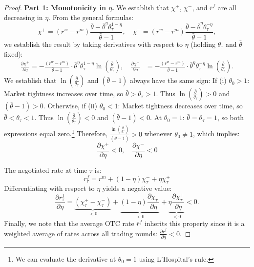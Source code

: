 \begin{proof}
\textbf{Part 1: Monotonicity in $\eta$.}  
We establish that $\chi^+$, $\chi^-$, and $\overline{r}^f$ are all decreasing in $\eta$. From the general formulas:
\begin{equation*}
\chi^+ = (r^w - r^m) \frac{\bar{\theta} - \bar{\theta}^{\eta}\theta_\tau^{1-\eta}}{\bar{\theta} - 1}, \quad \chi^- = (r^w - r^m) \frac{\bar{\theta} - \bar{\theta}^{\eta}\theta_\tau^{-\eta}}{\bar{\theta} - 1},
\end{equation*}
we establish the result by taking derivatives with respect to $\eta$ (holding $\theta_\tau$ and $\bar{\theta}$ fixed):
\begin{align*}
\frac{\partial \chi^+}{\partial \eta} = -\frac{(r^w - r^m)}{\bar{\theta} - 1} \cdot \bar{\theta}^{\eta}\theta_\tau^{1-\eta}\ln\left(\frac{\bar{\theta}}{\theta_\tau}\right),
\quad 
\frac{\partial \chi^-}{\partial \eta} &= -\frac{(r^w - r^m)}{\bar{\theta} - 1} \cdot \bar{\theta}^{\eta}\theta_\tau^{-\eta}\ln\left(\frac{\bar{\theta}}{\theta_\tau}\right).
\end{align*}
We establish that $\ln\left(\frac{\bar{\theta}}{\theta_\tau}\right)$ and $(\bar{\theta}-1)$ always have the same sign: If (i) $\theta_0 > 1$: Market tightness increases over time, so $\bar{\theta} > \theta_\tau > 1$. Thus $\ln\left(\frac{\bar{\theta}}{\theta_\tau}\right) > 0$ and $(\bar{\theta}-1) > 0$. Otherwise, if  (ii) $\theta_0 < 1$: Market tightness decreases over time, so $\bar{\theta} < \theta_\tau < 1$. Thus $\ln\left(\frac{\bar{\theta}}{\theta_\tau}\right) < 0$ and $(\bar{\theta}-1) < 0$. At $\theta_0 = 1$: $\bar{\theta} = \theta_\tau = 1$, so both expressions equal zero.\footnote{We can evaluate the derivative at $\theta_0 = 1$ using L'Hospital's rule.} Therefore, $\frac{\ln\left(\frac{\bar{\theta}}{\theta_\tau}\right)}{(\bar{\theta}-1)} > 0$ whenever $\theta_0 \neq 1$, which implies:
\begin{equation*}
\frac{\partial \chi^+}{\partial \eta} < 0, \quad \frac{\partial \chi^-}{\partial \eta} < 0
\end{equation*}

The negotiated rate at time $\tau$ is:
\begin{equation*}
r^f_\tau = r^m + (1-\eta)\chi^-_\tau + \eta\chi^+_\tau
\end{equation*}
Differentiating with respect to $\eta$ yields a negative value:
\begin{equation*}
\frac{\partial r^f_\tau}{\partial \eta} = \underbrace{(\chi^+_\tau - \chi^-_\tau)}_{<0} + \underbrace{(1-\eta)\frac{\partial \chi^-_\tau}{\partial \eta}}_{<0} + \underbrace{\eta\frac{\partial \chi^+_\tau}{\partial \eta}}_{<0} < 0.
\end{equation*}
Finally, we note that the average OTC rate $\overline{r}^f$ inherits this property since it is a weighted average of rates across all trading rounds: $\frac{\partial \overline{r}^f}{\partial \eta} < 0.$


\end{proof}
